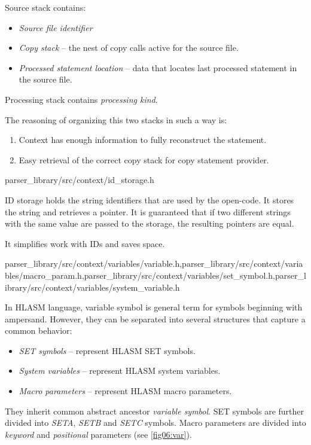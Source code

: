 Source stack contains:
\begin{itemize}
	\item \emph{Source file identifier}
	\item \emph{Copy stack} -- the nest of copy calls active for the source file.
	\item \emph{Processed statement location} -- data that locates last processed statement in the source file.
\end{itemize}
Processing stack contains \emph{processing kind}.

The reasoning of organizing this two stacks in such a way is:
\begin{enumerate}
	\item Context has enough information to fully reconstruct the statement.
	\item Easy retrieval of the correct copy stack for copy statement provider.
\end{enumerate} 

{parser\_library/src/context/id\_storage.h}

ID storage holds the string identifiers that are used by the open-code. 
It stores the string and retrieves a pointer. It is guaranteed that if two different strings with the same value are passed to the storage, the resulting pointers are equal.

It simplifies work with IDs and saves space. 

{parser\_library/src/context/variables/variable.h,parser\_library/src/context/variables/macro\_param.h,parser\_library/src/context/variables/set\_symbol.h,parser\_library/src/context/variables/system\_variable.h}
\label{lab06:var_sym}

In HLASM language, variable symbol is general term for symbols beginning with ampersand. However, they can be separated into several structures that capture a common behavior:

\begin{itemize}
	\item \emph{SET symbols} -- represent HLASM SET symbols.
	\item \emph{System variables} -- represent HLASM system variables.
	\item \emph{Macro parameters} -- represent HLASM macro parameters.
\end{itemize}

They inherit common abstract ancestor \emph{variable symbol}. SET symbols are further divided into \emph{SETA}, \emph{SETB} and \emph{SETC} symbols. Macro parameters are divided into \emph{keyword} and \emph{positional} parameters (see \cref{fig06:var}).

